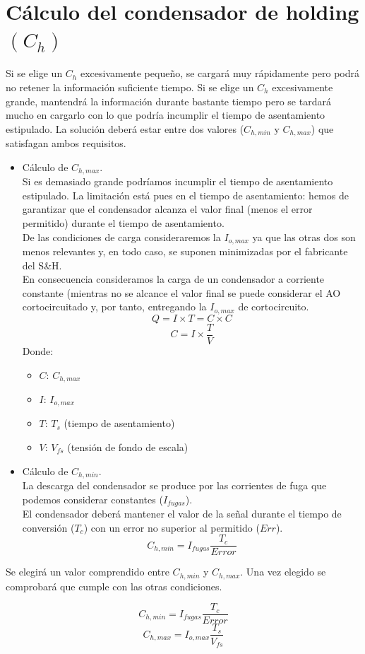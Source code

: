 \section{Cálculo del condensador de holding $(C_h)$}
Si se elige un $C_h$ excesivamente pequeño, se cargará muy rápidamente pero podrá no retener la información suficiente tiempo. Si se elige un $C_h$ excesivamente grande, mantendrá la información durante bastante tiempo pero se tardará mucho en cargarlo con lo que podría incumplir el tiempo de asentamiento estipulado. La solución deberá estar entre dos valores ($C_{h, min}$ y $C_{h,max}$) que satisfagan ambos requisitos.

\begin{itemize}
    \item Cálculo de $C_{h, max}$. \\
    Si es demasiado grande podríamos incumplir el tiempo de asentamiento estipulado. La limitación está pues en el tiempo de asentamiento: hemos de garantizar que el condensador alcanza el valor final (menos el error permitido) durante el tiempo de asentamiento. \\
    De las condiciones de carga consideraremos la $I_{o, max}$ ya que las otras dos son menos relevantes y, en todo caso, se suponen minimizadas por el fabricante del S\&H. \\
    En consecuencia consideramos la carga de un condensador a corriente constante (mientras no se alcance el valor final se puede considerar el AO cortocircuitado y, por tanto, entregando la $I_{o, max}$ de cortocircuito.
    \[Q = I \times T = C \times C\]
    \[C = I \times \frac{T}{V}\]
    Donde: 
    \begin{itemize}
        \item $C$: $C_{h, max}$
        \item $I$: $I_{o, max}$
        \item $T$: $T_s$ (tiempo de asentamiento)
        \item $V$: $V_{fs}$ (tensión de fondo de escala)
    \end{itemize}

    \item Cálculo de $C_{h, min}$. \\
    La descarga del condensador se produce por las corrientes de fuga que podemos considerar constantes ($I_{fugas}$). \\
    El condensador deberá mantener el valor de la señal durante el tiempo de conversión ($T_c$) con un error no superior al permitido ($Err$). 
    \[C_{h, min} = I_{fugas} \frac{T_c}{Error}\]
    
\end{itemize}

Se elegirá un valor comprendido entre $C_{h, min}$ y $C_{h,max}$. Una vez elegido se comprobará que cumple con las otras condiciones.

\[C_{h, min} = I_{fugas} \frac{T_c}{Error}\]
\[C_{h, max} = I_{o, max} \frac{T_s}{V_{fs}}\]